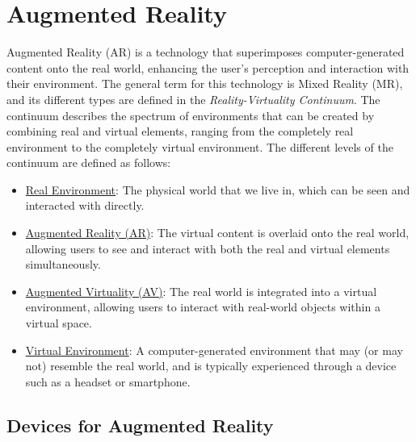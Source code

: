 \chapter{Augmented Reality}

Augmented Reality (AR) is a technology that superimposes computer-generated content onto the real world, enhancing the user's perception and interaction with their environment. The general term for this technology is Mixed Reality (MR), and its different types are defined in the \emph{Reality-Virtuality Continuum}. The continuum describes the spectrum of environments that can be created by combining real and virtual elements, ranging from the completely real environment to the completely virtual environment. The different levels of the continuum are defined as follows:
\begin{itemize}
    \item \ul{Real Environment}: The physical world that we live in, which can be seen and interacted with directly.
    \item \ul{Augmented Reality (AR)}: The virtual content is overlaid onto the real world, allowing users to see and interact with both the real and virtual elements simultaneously.
    \item \ul{Augmented Virtuality (AV)}: The real world is integrated into a virtual environment, allowing users to interact with real-world objects within a virtual space.
    \item \ul{Virtual Environment}: A computer-generated environment that may (or may not) resemble the real world, and is typically experienced through a device such as a headset or smartphone.
\end{itemize}

\section{Devices for Augmented Reality}

